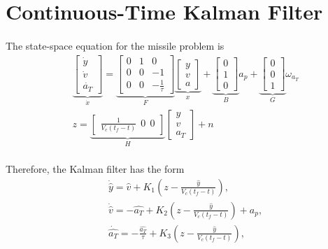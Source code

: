 \section{Continuous-Time Kalman Filter}

\paragraph{}
The state-space equation for the missile problem is
\begin{equation}
\begin{aligned}
&\underbrace{\begin{bmatrix}
\dot{y}\\\dot{v}\\\dot{a_T} 
\end{bmatrix}}_{\dot{x}} =\underbrace{\begin{bmatrix}
	0 & 1 & 0 \\ 0 & 0 & -1 \\ 0 & 0 & -\frac{1}{\tau}
	\end{bmatrix}}_F \underbrace{\begin{bmatrix}
	y\\v\\a
	\end{bmatrix}}_x + \underbrace{\begin{bmatrix}
	0\\1\\0
	\end{bmatrix}}_B a_p + \underbrace{\begin{bmatrix}
	0\\0\\1
	\end{bmatrix}}_G\omega_{a_T}\\
&z =\underbrace{\begin{bmatrix}
	\frac{1}{V_c(t_f-t)} \ \ 0 \ \ 0
	\end{bmatrix}}_H \begin{bmatrix}
	y\\v\\a_T
	\end{bmatrix} + n
\end{aligned}
\end{equation}
\paragraph{}
Therefore, the Kalman filter has the form
\begin{align*}
&\dot{\hat{y}} = \hat{v} + K_1(z-\frac{\hat{y}}{V_c(t_f -t)}),\\
&\dot{\hat{v}} = -\hat{a_T} + K_2(z-\frac{\hat{y}}{V_c(t_f -t)}) + a_p,\\
&\dot{\hat{a_T}} = -\frac{\hat{a_T}}{\tau} + K_3(z-\frac{\hat{y}}{V_c(t_f -t)}),
\end{align*}
